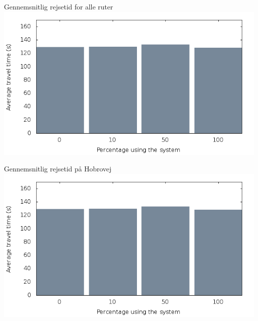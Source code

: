 \begin{frame}{Gennemsnitlig rejsetid for alle ruter}
\includegraphics[width=1\textwidth]{../images/tp0/combinedTime.png}
\end{frame}
\begin{frame}{Gennemsnitlig rejsetid på Hobrovej}
\includegraphics[width=1\textwidth]{../images/tp0/combinedTime.png}
\end{frame}




